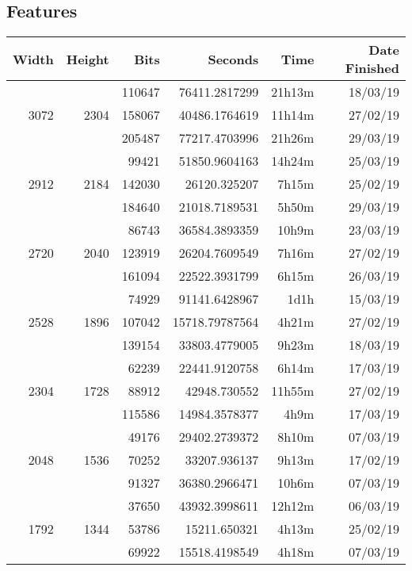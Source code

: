 \subsection{Features}
  \begin{center}
  \begin{tabular}{ r r r | r r r }
  Width & Height & Bits & Seconds & Time & Date Finished \\ \hline
  \multirow{3}{*}{3072} & \multirow{3}{*}{2304} & 110647 & 76411.2817299 & 21h13m & 18/03/19 \\
  & & 158067 & 40486.1764619 & 11h14m & 27/02/19 \\
  & & 205487 & 77217.4703996 & 21h26m & 29/03/19 \\
  \hline
  \multirow{3}{*}{2912} & \multirow{3}{*}{2184} & 99421 & 51850.9604163 & 14h24m & 25/03/19 \\
  & & 142030 & 26120.325207 & 7h15m & 25/02/19 \\
  & & 184640 & 21018.7189531 & 5h50m & 29/03/19 \\
  \hline
  \multirow{3}{*}{2720} & \multirow{3}{*}{2040} & 86743 & 36584.3893359 & 10h9m & 23/03/19 \\
  & & 123919 & 26204.7609549 & 7h16m & 27/02/19 \\
  & & 161094 & 22522.3931799 & 6h15m & 26/03/19 \\
  \hline
  \multirow{3}{*}{2528} & \multirow{3}{*}{1896} & 74929 & 91141.6428967 & 1d1h & 15/03/19 \\
  & & 107042 & 15718.79787564 & 4h21m & 27/02/19 \\
  & & 139154 & 33803.4779005 & 9h23m & 18/03/19 \\
  \hline
  \multirow{3}{*}{2304} & \multirow{3}{*}{1728} & 62239 & 22441.9120758 & 6h14m & 17/03/19 \\
  & & 88912 & 42948.730552 & 11h55m & 27/02/19 \\
  & & 115586 & 14984.3578377 & 4h9m & 17/03/19 \\
  \hline
  \multirow{3}{*}{2048} & \multirow{3}{*}{1536} & 49176 & 29402.2739372 & 8h10m & 07/03/19 \\
  & & 70252 & 33207.936137 & 9h13m & 17/02/19 \\
  & & 91327 & 36380.2966471 & 10h6m & 07/03/19 \\
  \hline
  \multirow{3}{*}{1792} & \multirow{3}{*}{1344} & 37650 & 43932.3998611 & 12h12m & 06/03/19 \\
  & & 53786 & 15211.650321 & 4h13m & 25/02/19 \\
  & & 69922 & 15518.4198549 & 4h18m & 07/03/19 \\

\end{tabular}
\end{center}
